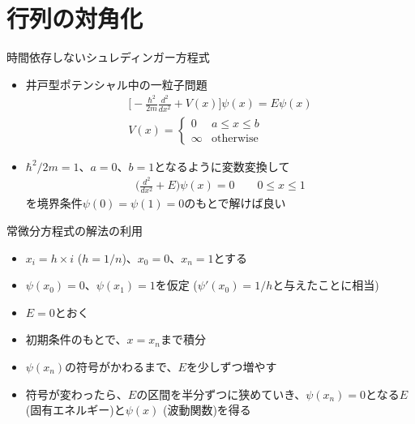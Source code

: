 \section{行列の対角化}

\begin{frame}[t,fragile]{時間依存しないシュレディンガー方程式}
  \begin{itemize}
    \setlength{\itemsep}{1em}
  \item 井戸型ポテンシャル中の一粒子問題
    \begin{align*}
      \big[ -\frac{\hbar^2}{2m}\frac{d^2}{dx^2} + V(x) \big] \psi(x) = E \psi(x) \\
      V(x) = \begin{cases}
        0 & \text{$a \le x \le b$} \\ \infty & \text{otherwise}
      \end{cases}
    \end{align*}
  \item $\hbar^2/2m = 1$、$a=0$、$b=1$となるように変数変換して
    \begin{align*}
      \big( \frac{d^2}{dx^2} + E \big) \psi(x) = 0 \qquad 0 \le x \le 1
    \end{align*}
    を境界条件$\psi(0) = \psi(1) = 0$のもとで解けば良い
  \end{itemize}
\end{frame}

\begin{frame}[t,fragile]{常微分方程式の解法の利用}
  \begin{itemize}
    \setlength{\itemsep}{1em}
  \item $x_i=h \times i$ ($h=1/n$)、$x_0=0$、$x_n=1$とする
  \item $\psi(x_0)=0$、$\psi(x_1) = 1$を仮定 ($\psi'(x_0)=1/h$と与えたことに相当)
  \item $E = 0$とおく
  \item 初期条件のもとで、$x=x_n$まで積分
  \item $\psi(x_n)$の符号がかわるまで、$E$を少しずつ増やす
  \item 符号が変わったら、$E$の区間を半分ずつに狭めていき、$\psi(x_n)=0$となる$E$ (固有エネルギー)と$\psi(x)$ (波動関数)を得る
  \end{itemize}
\end{frame}

